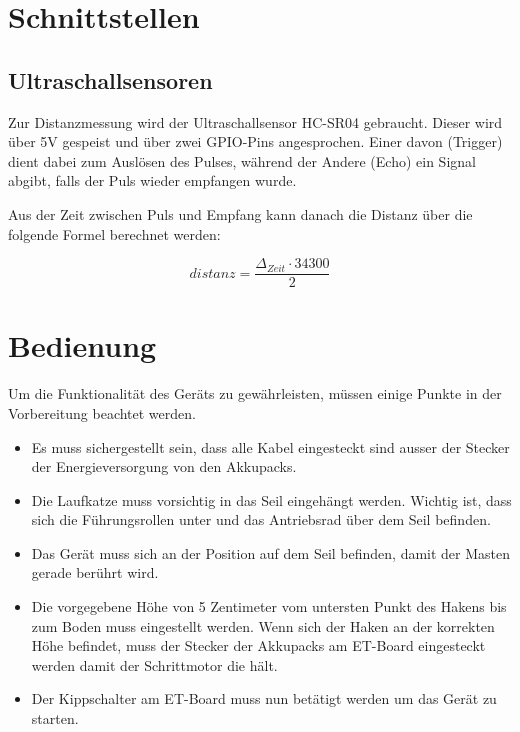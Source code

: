 \documentclass[a4paper]{report}
\begin{document}
\section{Schnittstellen}
\label{sec:Schnittstellen}

\subsection{Ultraschallsensoren}
\label{ssec:UltrasonicSensorInterface}

Zur Distanzmessung wird der Ultraschallsensor HC-SR04 gebraucht. Dieser wird über 5V gespeist und über zwei GPIO-Pins angesprochen. Einer davon (Trigger) dient dabei zum Auslösen des Pulses, während der Andere (Echo) ein Signal abgibt, falls der Puls wieder empfangen wurde.

Aus der Zeit zwischen Puls und Empfang kann danach die Distanz über die folgende Formel berechnet werden:

\begin{equation*}
	distanz = \frac{\Delta_{Zeit} \cdot 34300}{2}
\end{equation*}

\section{Bedienung}
\label{sec:Bedienung}
Um die Funktionalität des Geräts zu gewährleisten, müssen einige Punkte in der Vorbereitung beachtet werden.

\begin{itemize}
	\item Es muss sichergestellt sein, dass alle Kabel eingesteckt sind ausser der Stecker der Energieversorgung von den Akkupacks.
	\item Die Laufkatze muss vorsichtig in das Seil eingehängt werden. Wichtig ist, dass sich die Führungsrollen unter und das Antriebsrad über dem Seil befinden.
	\item Das Gerät muss sich an der Position auf dem Seil befinden, damit der Masten gerade berührt wird.
	\item Die vorgegebene Höhe von 5 Zentimeter vom untersten Punkt des Hakens bis zum Boden muss eingestellt werden. Wenn sich der Haken an der korrekten Höhe befindet, muss der Stecker der Akkupacks am ET-Board eingesteckt werden damit der Schrittmotor die hält.
	\item Der Kippschalter am ET-Board muss nun betätigt werden um das Gerät zu starten.
\end{itemize}
\end{document}
